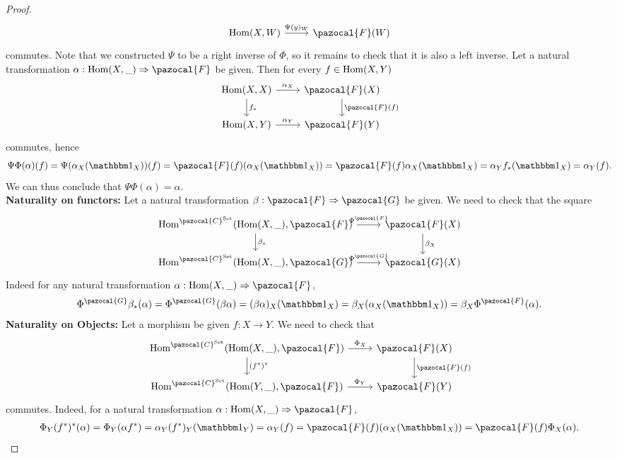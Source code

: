 \begin{proof}
$$\begin{tikzcd}
            \Hom(X,W) \arrow[r,"\Psi(y)_W"] & \pazocal{F}(W)
        \end{tikzcd}
    $$
    commutes. Note that we constructed $\Psi$ to be a right inverse of $\Phi$, so it remains to check that it is also a left inverse. Let a natural transformation $\alpha: \Hom(X,\_)\Rightarrow \pazocal{F}$ be given. Then for every $f\in \mathrm{Hom}(X,Y)$
    $$
        \begin{tikzcd} 
            \Hom(X,X) \arrow[r,"\alpha_X"] \arrow[d,"f_\ast"] & \pazocal{F}(X) \arrow[d,"\pazocal{F}(f)"]\\
            \Hom(X,Y) \arrow[r, "\alpha_Y"] & \pazocal{F}(Y)
        \end{tikzcd}
    $$ 
    commutes, hence 
    $$
        \Psi\Phi(\alpha)(f)= \Psi(\alpha_X(\fone_X))(f) = \pazocal{F}(f)(\alpha_X(\fone_X)) = \pazocal{F}(f)\alpha_X(\fone_X)=\alpha_Y f_\ast(\fone_X)=\alpha_Y(f).
    $$
    We can thus conclude that $\Psi\Phi(\alpha)=\alpha$.\\
    \textbf{Naturality on functors:} Let a natural transformation $\beta : \pazocal{F}\Rightarrow \pazocal{G}$ be given. We need to check that the square
    $$
        \begin{tikzcd}
            \Hom^{\pazocal{C}^\mathrm{Set}}(\Hom(X,\_),\pazocal{F}) \arrow[r,"\Phi^\pazocal{F}"]\arrow[d,"\beta_\ast"] & \pazocal{F}(X)\arrow[d,"\beta_X"]\\
            \Hom^{\pazocal{C}^\mathrm{Set}}(\Hom(X,\_),\pazocal{G}) \arrow[r,"\Phi^\pazocal{G}"] & \pazocal{G}(X)
        \end{tikzcd}
    $$
    Indeed for any natural transformation $\alpha : \Hom(X,\_)\Rightarrow \pazocal{F}$,
    \begin{align*}
        \Phi^\pazocal{G}\beta_\ast(\alpha) = \Phi^\pazocal{G}(\beta\alpha) = (\beta\alpha)_X(\fone_X)= \beta_X(\alpha_X(\fone_X))= \beta_X\Phi^\pazocal{F}(\alpha).
    \end{align*}
    \textbf{Naturality on Objects:} Let a morphism be given $f:X\rightarrow Y$. We need to check that 
    $$
        \begin{tikzcd}
            \Hom^{\pazocal{C}^\mathrm{Set}}(\Hom(X,\_),\pazocal{F}) \arrow[r,"\Phi_X"]\arrow[d,"(f^\ast)^\ast"] & \pazocal{F}(X)\arrow[d,"\pazocal{F}(f)"]\\
            \Hom^{\pazocal{C}^\mathrm{Set}}(\Hom(Y,\_),\pazocal{F}) \arrow[r,"\Phi_Y"] & \pazocal{F}(Y)
        \end{tikzcd}
    $$
    commutes. Indeed, for a natural transformation $\alpha: \Hom(X,\_)\Rightarrow \pazocal{F}$, 
    \begin{align*}
        \Phi_Y(f^\ast)^\ast(\alpha)= \Phi_Y(\alpha f^\ast) = \alpha_Y (f^\ast)_Y(\fone_Y) = \alpha_Y(f) = \pazocal{F}(f)(\alpha_X(\fone_X))= \pazocal{F}(f)\Phi_X(\alpha).
    \end{align*}
\end{proof}
